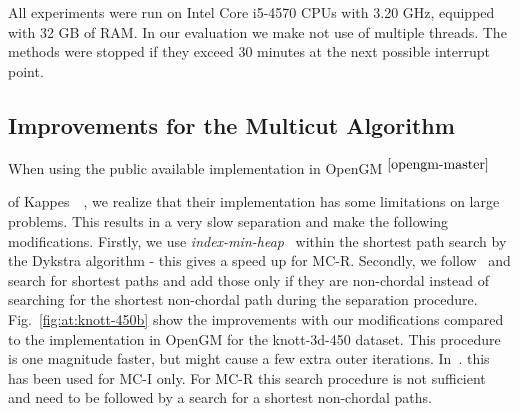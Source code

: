 \documentclass[10pt,twocolumn,letterpaper]{article}
\newcommand{\footref}[1]{%
    $^{\ref{#1}}$%
}
\theoremstyle{definition}
\begin{document}
All experiments were run on Intel Core i5-4570 CPUs
with 3.20 GHz, equipped with 32 GB of RAM.
In our evaluation we make not use of multiple threads.
The methods were stopped if they exceed 30 minutes at the next possible interrupt point.



\subsection{Improvements for the Multicut Algorithm}\label{sec:tunedMC} 
When using the  public available implementation in OpenGM\footref{opengm-master}
of Kappes~\etal~\cite{kappes_2013_arxiv}, we realize that their implementation has some limitations on large problems.
This results in a very slow separation and make the following modifications.
Firstly, we use \emph{index-min-heap}~\cite{Sedgewick-2011} within the shortest path search by the Dykstra algorithm - this gives a speed up for MC-R.
Secondly, we follow~\cite{kroeger_2012_eccv} and search for shortest paths and add those only if they are non-chordal instead of searching for the shortest non-chordal path
during the separation procedure. Fig.~\ref{fig:at:knott-450b} show the improvements with our modifications compared to the implementation in OpenGM for the knott-3d-450 dataset.
This procedure is one magnitude faster, but might cause a few extra outer iterations.
In~\cite{kroeger_2012_eccv}. this has been used for MC-I only. 
For MC-R this search procedure is not sufficient and need to be followed by a search for a shortest non-chordal paths.
\end{document}
